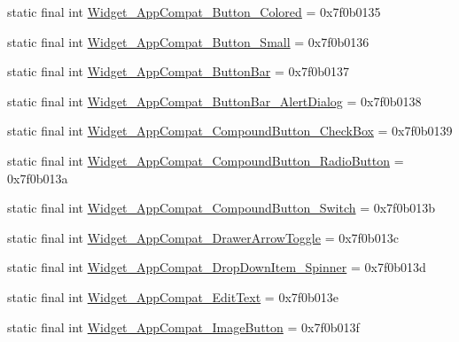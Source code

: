 \begin{CompactItemize}
\item 
static final int \hyperlink{classandroid_1_1support_1_1graphics_1_1drawable_1_1animated_1_1_r_1_1style_333320468684b764ec425de7fb245437}{Widget\_\-AppCompat\_\-Button\_\-Colored} = 0x7f0b0135
\item 
static final int \hyperlink{classandroid_1_1support_1_1graphics_1_1drawable_1_1animated_1_1_r_1_1style_0a4c6b87e38082bac8a20a31bd0975a2}{Widget\_\-AppCompat\_\-Button\_\-Small} = 0x7f0b0136
\item 
static final int \hyperlink{classandroid_1_1support_1_1graphics_1_1drawable_1_1animated_1_1_r_1_1style_a5b327e9ac604968dc7697e235fcc3b5}{Widget\_\-AppCompat\_\-ButtonBar} = 0x7f0b0137
\item 
static final int \hyperlink{classandroid_1_1support_1_1graphics_1_1drawable_1_1animated_1_1_r_1_1style_17c3250e5d9552299ffd643b6c3ebbd1}{Widget\_\-AppCompat\_\-ButtonBar\_\-AlertDialog} = 0x7f0b0138
\item 
static final int \hyperlink{classandroid_1_1support_1_1graphics_1_1drawable_1_1animated_1_1_r_1_1style_50f73c3fec8b0977cfcfe79ffc782738}{Widget\_\-AppCompat\_\-CompoundButton\_\-CheckBox} = 0x7f0b0139
\item 
static final int \hyperlink{classandroid_1_1support_1_1graphics_1_1drawable_1_1animated_1_1_r_1_1style_2ae9a6a93496680d0c044896331775a8}{Widget\_\-AppCompat\_\-CompoundButton\_\-RadioButton} = 0x7f0b013a
\item 
static final int \hyperlink{classandroid_1_1support_1_1graphics_1_1drawable_1_1animated_1_1_r_1_1style_d89ab9bddcd6300329aabc8721497b1f}{Widget\_\-AppCompat\_\-CompoundButton\_\-Switch} = 0x7f0b013b
\item 
static final int \hyperlink{classandroid_1_1support_1_1graphics_1_1drawable_1_1animated_1_1_r_1_1style_a683d2ceedd00cda02834fb0d857a26e}{Widget\_\-AppCompat\_\-DrawerArrowToggle} = 0x7f0b013c
\item 
static final int \hyperlink{classandroid_1_1support_1_1graphics_1_1drawable_1_1animated_1_1_r_1_1style_010ea107edd0fe27aa1fdfb7328990a8}{Widget\_\-AppCompat\_\-DropDownItem\_\-Spinner} = 0x7f0b013d
\item 
static final int \hyperlink{classandroid_1_1support_1_1graphics_1_1drawable_1_1animated_1_1_r_1_1style_bc24f2e3ad5cfe17f182b71de3efcc18}{Widget\_\-AppCompat\_\-EditText} = 0x7f0b013e
\item 
static final int \hyperlink{classandroid_1_1support_1_1graphics_1_1drawable_1_1animated_1_1_r_1_1style_47b66987b5e22b894fc5b143399f91ec}{Widget\_\-AppCompat\_\-ImageButton} = 0x7f0b013f

\end{CompactItemize}
